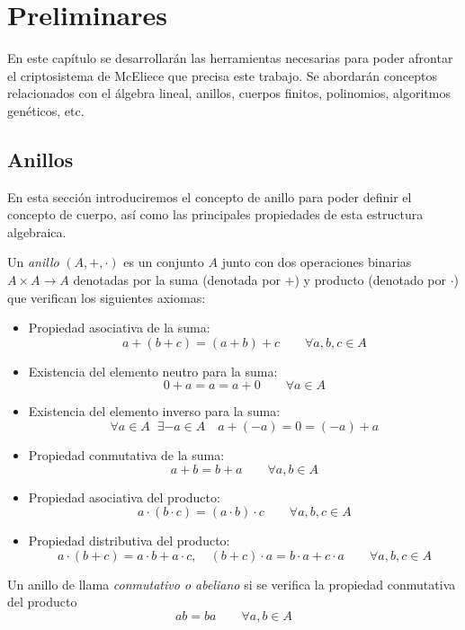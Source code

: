 

\chapter{Preliminares}

En este capítulo se desarrollarán las herramientas necesarias para poder afrontar el criptosistema de McEliece que precisa este trabajo. Se abordarán conceptos relacionados con el álgebra lineal, anillos, cuerpos finitos, polinomios, algoritmos genéticos, etc.

\section{Anillos}

En esta sección introduciremos el concepto de anillo para poder definir el concepto de cuerpo, así como las principales propiedades de esta estructura algebraica.

\begin{definition}
    Un \emph{anillo} $(A, +, \cdot )$ es un conjunto $A$ junto con dos operaciones binarias $A \times A \rightarrow A$ denotadas por la suma (denotada por $+$) y producto (denotado por $\cdot$) que verifican los siguientes axiomas:

    \begin{itemize}
        \item Propiedad asociativa de la suma: 
        $$  a + (b + c) = (a + b) + c \qquad \forall a,b,c \in A$$
        \item Existencia del elemento neutro para la suma:
        $$ 0 + a = a = a + 0 \qquad \forall a \in A$$
        \item Existencia del elemento inverso para la suma:
        $$ \forall a \in A \; \; \exists -a \in A \quad a + (-a) = 0 = (-a) + a $$
        \item Propiedad conmutativa de la suma:
        $$ a + b = b + a \qquad \forall a,b \in A $$
        \item Propiedad asociativa del producto:
        $$ a \cdot (b \cdot c) = (a \cdot b) \cdot c \qquad \forall a,b,c \in A $$
        \item Propiedad distributiva del producto:
        $$ a \cdot (b + c) = a \cdot b + a \cdot c, \quad (b + c) \cdot a = b \cdot a + c \cdot a \qquad \forall a,b,c \in A $$
        
    \end{itemize}

    Un anillo de llama \emph{conmutativo o abeliano} si se verifica la propiedad conmutativa del producto 
    $$ ab = ba \qquad \forall a,b \in A $$
\end{definition}

